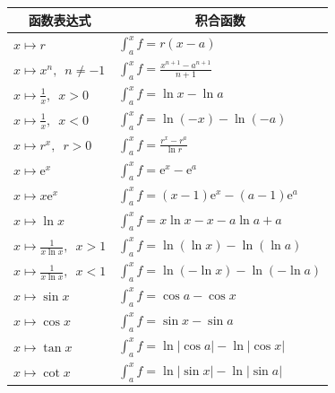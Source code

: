 \documentclass[12pt,UTF8,fontset=none]{ctexbook}
\begin{document}
\begin{appendix}
\begin{center}
    \renewcommand{\arraystretch}{2}
    \setlength{\extrarowheight}{-3pt}
    \begin{longtable}{|l|l|}
        \hline \multicolumn{1}{|c|}{\textbf{函数表达式}} & \multicolumn{1}{c|}{\textbf{积合函数}} \\[4pt] 
        \hline    
        $\displaystyle x\mapsto r$ & $\displaystyle \int_a^x f = r(x - a)$ \\[4pt]
        \hline    
        $\displaystyle x\mapsto x^n,\,\,\,n\neq -1$ & $\displaystyle \int_a^x f = \frac{x^{n+1} - a^{n+1}}{n+1}$ \\[4pt]
        \hline    
        $\displaystyle x\mapsto \frac{1}{x}, \,\,\, x > 0$ & $\displaystyle \int_a^x f = \ln{x} - \ln{a}$ \\[4pt]
        \hline    
        $\displaystyle x\mapsto \frac{1}{x}, \,\,\, x < 0$ & $\displaystyle \int_a^x f = \ln{(-x)} - \ln{(-a)}$ \\[4pt]
        \hline
        $\displaystyle x\mapsto r^x,\,\,\, r>0$ & $\displaystyle \int_a^x f = \frac{r^x - r^a}{\ln{r}}$ \\[4pt]
        \hline
        $\displaystyle x\mapsto \mathrm{e}^x$ & $\displaystyle \int_a^x f = \mathrm{e}^x - \mathrm{e}^a$ \\[4pt]
        \hline    
        $\displaystyle x\mapsto x\mathrm{e}^x$ & $\displaystyle \int_a^x f = (x - 1)\mathrm{e}^x - (a - 1)\mathrm{e}^a$ \\[4pt]
        \hline
        $\displaystyle x\mapsto \ln{x}$ & $\displaystyle \int_a^x f = x\ln{x} - x - a\ln{a} + a$ \\[4pt]
        \hline
        $\displaystyle x\mapsto \frac{1}{x\ln{x}},\,\,\, x>1$ & $\displaystyle \int_a^x f = \ln{(\ln{x})} - \ln{(\ln{a})}$ \\[4pt]
        \hline
        $\displaystyle x\mapsto \frac{1}{x\ln{x}},\,\,\, x<1$ & $\displaystyle \int_a^x f = \ln{(-\ln{x})} - \ln{(-\ln{a})}$ \\[4pt]
        \hline    
        $\displaystyle x\mapsto \sin{x}$ & $\displaystyle \int_a^x f = \cos{a} - \cos{x}$ \\[4pt]
        \hline    
        $\displaystyle x\mapsto \cos{x}$ & $\displaystyle \int_a^x f = \sin{x} - \sin{a}$ \\[4pt]
        \hline    
        $\displaystyle x\mapsto \tan{x}$ & $\displaystyle \int_a^x f = \ln{|\cos{a}|} - \ln{|\cos{x}|}$ \\[4pt]
        \hline    
        $\displaystyle x\mapsto \cot{x}$ & $\displaystyle \int_a^x f = \ln{|\sin{x}|} - \ln{|\sin{a}|}$ \\[4pt]

\end{longtable}
\end{center}
\end{appendix}
\end{document}
